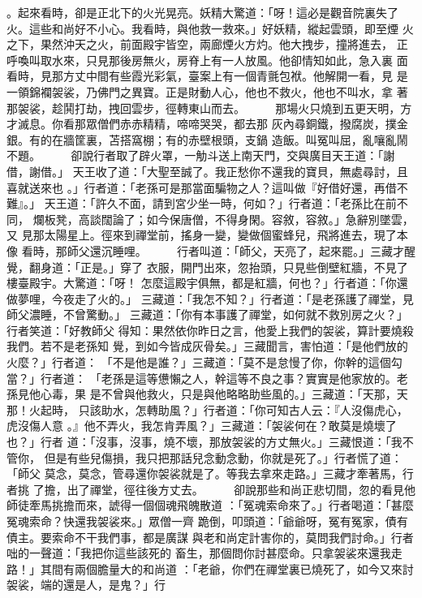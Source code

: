 \begin{pinyinscope}
{。起來看時，卻是正北下的火光晃亮。妖精大驚道：「呀！這必是觀音院裏失了
火。這些和尚好不小心。我看時，與他救一救來。」好妖精，縱起雲頭，即至煙
火之下，果然沖天之火，前面殿宇皆空，兩廊煙火方灼。他大拽步，撞將進去，
正呼喚叫取水來，只見那後房無火，房脊上有一人放風。他卻情知如此，急入裏
面看時，見那方丈中間有些霞光彩氣，臺案上有一個青氈包袱。他解開一看，見
是一領錦襴袈裟，乃佛門之異寶。正是財動人心，他也不救火，他也不叫水，拿
著那袈裟，趁鬨打劫，拽回雲步，徑轉東山而去。
　　
那場火只燒到五更天明，方才滅息。你看那眾僧們赤赤精精，啼啼哭哭，都去那
灰內尋銅鐵，撥腐炭，撲金銀。有的在牆筐裏，苫搭窩棚；有的赤壁根頭，支鍋
造飯。叫冤叫屈，亂嚷亂鬧不題。
　　
卻說行者取了辟火罩，一觔斗送上南天門，交與廣目天王道：「謝借，謝借。」
天王收了道：「大聖至誠了。我正愁你不還我的寶貝，無處尋討，且喜就送來也
。」行者道：「老孫可是那當面騙物之人？這叫做『好借好還，再借不難』。」
天王道：「許久不面，請到宮少坐一時，何如？」行者道：「老孫比在前不同，
爛板凳，高談闊論了；如今保唐僧，不得身閑。容敘，容敘。」急辭別墜雲，又
見那太陽星上。徑來到禪堂前，搖身一變，變做個蜜蜂兒，飛將進去，現了本像
看時，那師父還沉睡哩。
　　
行者叫道：「師父，天亮了，起來罷。」三藏才醒覺，翻身道：「正是。」穿了
衣服，開門出來，忽抬頭，只見些倒壁紅牆，不見了樓臺殿宇。大驚道：「呀！
怎麼這殿宇俱無，都是紅牆，何也？」行者道：「你還做夢哩，今夜走了火的。」
三藏道：「我怎不知？」行者道：「是老孫護了禪堂，見師父濃睡，不曾驚動。」
三藏道：「你有本事護了禪堂，如何就不救別房之火？」行者笑道：「好教師父
得知：果然依你昨日之言，他愛上我們的袈裟，算計要燒殺我們。若不是老孫知
覺，到如今皆成灰骨矣。」三藏聞言，害怕道：「是他們放的火麼？」行者道：
「不是他是誰？」三藏道：「莫不是怠慢了你，你幹的這個勾當？」行者道：
「老孫是這等憊懶之人，幹這等不良之事？實實是他家放的。老孫見他心毒，果
是不曾與他救火，只是與他略略助些風的。」三藏道：「天那，天那！火起時，
只該助水，怎轉助風？」行者道：「你可知古人云：『人沒傷虎心，虎沒傷人意
。』他不弄火，我怎肯弄風？」三藏道：「袈裟何在？敢莫是燒壞了也？」行者
道：「沒事，沒事，燒不壞，那放袈裟的方丈無火。」三藏恨道：「我不管你，
但是有些兒傷損，我只把那話兒念動念動，你就是死了。」行者慌了道：「師父
莫念，莫念，管尋還你袈裟就是了。等我去拿來走路。」三藏才牽著馬，行者挑
了擔，出了禪堂，徑往後方丈去。
　　
卻說那些和尚正悲切間，忽的看見他師徒牽馬挑擔而來，諕得一個個魂飛魄散道
：「冤魂索命來了。」行者喝道：「甚麼冤魂索命？快還我袈裟來。」眾僧一齊
跪倒，叩頭道：「爺爺呀，冤有冤家，債有債主。要索命不干我們事，都是廣謀
與老和尚定計害你的，莫問我們討命。」行者咄的一聲道：「我把你這些該死的
畜生，那個問你討甚麼命。只拿袈裟來還我走路！」其間有兩個膽量大的和尚道
：「老爺，你們在禪堂裏已燒死了，如今又來討袈裟，端的還是人，是鬼？」行
}
\end{pinyinscope}
